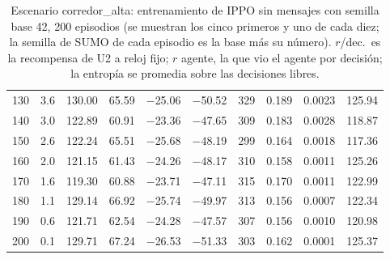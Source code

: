 \begin{table}[H]
\begin{tabular}{rrrrrrrrrr}
130 & 3.6 & 130.00 & 65.59 & $-$25.06 & $-$50.52 & 329 & 0.189 & 0.0023 & 125.94 \\
140 & 3.0 & 122.89 & 60.91 & $-$23.36 & $-$47.65 & 309 & 0.183 & 0.0028 & 118.87 \\
150 & 2.6 & 122.24 & 65.51 & $-$25.68 & $-$48.19 & 299 & 0.164 & 0.0018 & 117.36 \\
160 & 2.0 & 121.15 & 61.43 & $-$24.26 & $-$48.17 & 310 & 0.158 & 0.0011 & 125.26 \\
170 & 1.6 & 119.30 & 60.88 & $-$23.71 & $-$47.11 & 315 & 0.170 & 0.0011 & 122.99 \\
180 & 1.1 & 129.14 & 66.92 & $-$25.74 & $-$49.97 & 313 & 0.156 & 0.0007 & 122.34 \\
190 & 0.6 & 121.71 & 62.54 & $-$24.28 & $-$47.57 & 307 & 0.156 & 0.0010 & 120.98 \\
200 & 0.1 & 129.71 & 67.24 & $-$26.53 & $-$51.33 & 303 & 0.162 & 0.0001 & 125.37 \\
\bottomrule
\end{tabular}
\caption[Escenario corredor\_alta: entrenamiento de IPPO sin mensajes, semilla base 42]{Escenario corredor\_alta: entrenamiento de IPPO sin mensajes con semilla base 42, 200 episodios (se muestran los cinco primeros y uno de cada diez; la semilla de SUMO de cada episodio es la base más su número). $r$/dec.\ es la recompensa de U2 a reloj fijo; $r$ agente, la que vio el agente por decisión; la entropía se promedia sobre las decisiones libres.}
\label{tab:corredor_alta-ippo-local-42}
\end{table}

